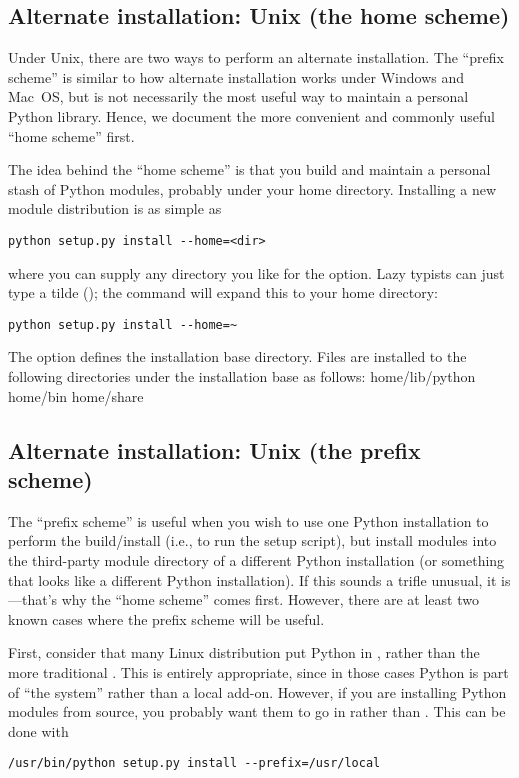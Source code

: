 \documentclass{howto}
\begin{document}
\subsection{Alternate installation: Unix (the home scheme)}
\label{sec:alt-unix-prefix}

Under Unix, there are two ways to perform an alternate installation.
The ``prefix scheme'' is similar to how alternate installation works
under Windows and Mac~OS, but is not necessarily the most useful way to
maintain a personal Python library.  Hence, we document the more
convenient and commonly useful ``home scheme'' first.

The idea behind the ``home scheme'' is that you build and maintain a
personal stash of Python modules, probably under your home directory.
Installing a new module distribution is as simple as
\begin{verbatim}
python setup.py install --home=<dir>
\end{verbatim}
where you can supply any directory you like for the 
option.  Lazy typists can just type a tilde (\code{\tilde}); the
 command will expand this to your home directory:
\begin{verbatim}
python setup.py install --home=~
\end{verbatim}

The  option defines the installation base directory.  Files
are installed to the following directories under the installation base
as follows:
              {home}{/lib/python}
              {home}{/bin}
              {home}{/share}

\subsection{Alternate installation: Unix (the prefix scheme)}
\label{sec:alt-unix-home}

The ``prefix scheme'' is useful when you wish to use one Python
installation to perform the build/install (i.e., to run the setup
script), but install modules into the third-party module directory of a
different Python installation (or something that looks like a different
Python installation).  If this sounds a trifle unusual, it is---that's
why the ``home scheme'' comes first.  However, there are at least two
known cases where the prefix scheme will be useful.

First, consider that many Linux distribution put Python in ,
rather than the more traditional .  This is entirely
appropriate, since in those cases Python is part of ``the system''
rather than a local add-on.  However, if you are installing Python
modules from source, you probably want them to go in
 rather than
.  This can be done with
\begin{verbatim}
/usr/bin/python setup.py install --prefix=/usr/local
\end{verbatim}
\end{document}
